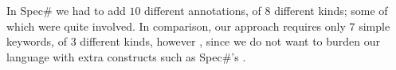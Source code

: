 In Spec\# we had to add $10$ different annotations, of $8$ different kinds; some of which were quite involved. In comparison, our approach requires only $7$ simple keywords, of $3$ different kinds, however , since we do not want to burden our language with extra constructs such as Spec\#'s \Q@expose@.

%

